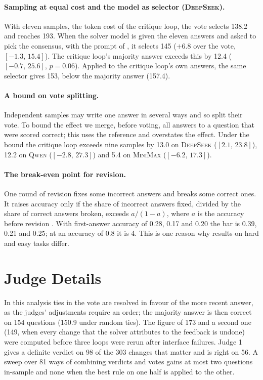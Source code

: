 \documentclass[11pt]{article}
\newcommand{\ds}{\textsc{DeepSeek}}
\newcommand{\qw}{\textsc{Qwen}}
\newcommand{\mm}{\textsc{MiniMax}}
\newcommand{\ci}[2]{$[#1,\,#2]$}
\begin{document}
\paragraph{Sampling at equal cost and the model as selector (\ds).}
With eleven samples, the token cost of the critique loop, the vote selects 138.2 and reaches 193.
When the solver model is given the eleven answers and asked to pick the consensus, with the prompt of \citet{chen2023usc}, it selects 145 ($+6.8$ over the vote, \ci{-1.3}{15.4}).
The critique loop's majority answer exceeds this by 12.4 (\ci{-0.7}{25.6}, $p=0.06$).
Applied to the critique loop's own answers, the same selector gives 153, below the majority answer (157.4).

\paragraph{A bound on vote splitting.}
Independent samples may write one answer in several ways and so split their vote.
To bound the effect we merge, before voting, all answers to a question that were scored correct; this uses the reference and overstates the effect.
Under the bound the critique loop exceeds nine samples by 13.0 on \ds{} (\ci{2.1}{23.8}), 12.2 on \qw{} (\ci{-2.8}{27.3}) and 5.4 on \mm{} (\ci{-6.2}{17.3}).

\paragraph{The break-even point for revision.}
One round of revision fixes some incorrect answers and breaks some correct ones.
It raises accuracy only if the share of incorrect answers fixed, divided by the share of correct answers broken, exceeds $a/(1-a)$, where $a$ is the accuracy before revision \citep{yang2024confidence}.
With first-answer accuracy of 0.28, 0.17 and 0.20 the bar is 0.39, 0.21 and 0.25; at an accuracy of 0.8 it is 4.
This is one reason why results on hard and easy tasks differ.

\section{Judge Details}
\label{app:judges}

In this analysis ties in the vote are resolved in favour of the more recent answer, as the judges' adjustments require an order; the majority answer is then correct on 154 questions (150.9 under random ties).
The figure of 173 and a second one (149, when every change that the solver attributes to the feedback is undone) were computed before three loops were rerun after interface failures.
Judge 1 gives a definite verdict on 98 of the 303 changes that matter and is right on 56.
A sweep over 81 ways of combining verdicts and votes gains at most two questions in-sample and none when the best rule on one half is applied to the other.
\end{document}
